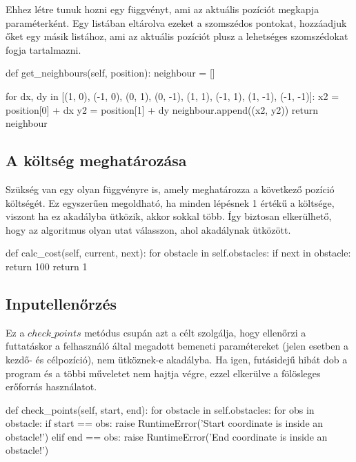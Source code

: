 \newpage

Ehhez létre tunuk hozni egy függvényt, ami az aktuális pozíciót megkapja paraméterként. Egy listában eltárolva ezeket a szomszédos pontokat, hozzáadjuk őket egy másik listához, ami az aktuális pozíciót plusz a lehetséges szomszédokat fogja tartalmazni. 

\begin{python}
	def get_neighbours(self, position):
        neighbour = []

        for dx, dy in [(1, 0), (-1, 0), (0, 1), (0, -1),
                       (1, 1), (-1, 1), (1, -1), (-1, -1)]:
            x2 = position[0] + dx
            y2 = position[1] + dy
            neighbour.append((x2, y2))
        return neighbour 
\end{python}

\subsection{A költség meghatározása}

Szükség van egy olyan függvényre is, amely meghatározza a következő pozíció költségét. Ez egyszerűen megoldható, ha minden lépésnek 1 értékű a költsége, viszont ha ez akadályba ütközik, akkor sokkal több. Így biztosan elkerülhető, hogy az algoritmus olyan utat válasszon, ahol akadálynak ütközött.
\begin{python}
    def calc_cost(self, current, next):
        for obstacle in self.obstacles:
            if next in obstacle:
                return 100
        return 1
\end{python}

\subsection{Inputellenőrzés}
Ez a $ check\_points $ metódus csupán azt a célt szolgálja, hogy ellenőrzi a futtatáskor a felhasználó által megadott bemeneti paramétereket (jelen esetben a kezdő- és célpozíció), nem ütköznek-e akadályba. Ha igen, futásidejű hibát dob a program és a többi műveletet nem hajtja végre, ezzel elkerülve a fölösleges erőforrás használatot.
\begin{python}
	def check_points(self, start, end):
        for obstacle in self.obstacles:
            for obs in obstacle:
                if start == obs:
                    raise RuntimeError('Start coordinate is inside 
                    an obstacle!')
                elif end == obs:
                    raise RuntimeError('End coordinate is inside
                    an obstacle!')
\end{python}

